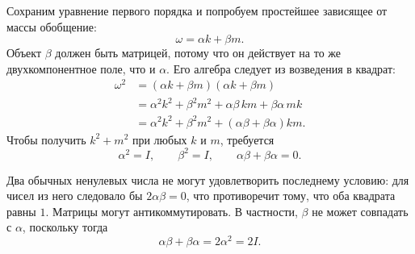 Сохраним уравнение первого порядка и попробуем простейшее зависящее от массы обобщение:
\begin{equation}
\omega=\alpha k+\beta m.
\end{equation}
Объект \(\beta\) должен быть матрицей, потому что он действует на то же двухкомпонентное поле, что и \(\alpha\). Его алгебра следует из возведения в квадрат:
\begin{align}
\omega^2
&=(\alpha k+\beta m)(\alpha k+\beta m)\\
&=\alpha^2k^2+\beta^2m^2
+\alpha\beta\,km+\beta\alpha\,mk\\
&=\alpha^2k^2+\beta^2m^2
+(\alpha\beta+\beta\alpha)km.
\end{align}
Чтобы получить \(k^2+m^2\) при любых \(k\) и \(m\), требуется
\begin{equation}
\alpha^2=I,
\qquad
\beta^2=I,
\qquad
\alpha\beta+\beta\alpha=0.
\end{equation}

Два обычных ненулевых числа не могут удовлетворить последнему условию: для чисел из него следовало бы \(2\alpha\beta=0\), что противоречит тому, что оба квадрата равны \(1\). Матрицы могут антикоммутировать. В частности, \(\beta\) не может совпадать с \(\alpha\), поскольку тогда
\begin{equation}
\alpha\beta+\beta\alpha=2\alpha^2=2I.
\end{equation}

